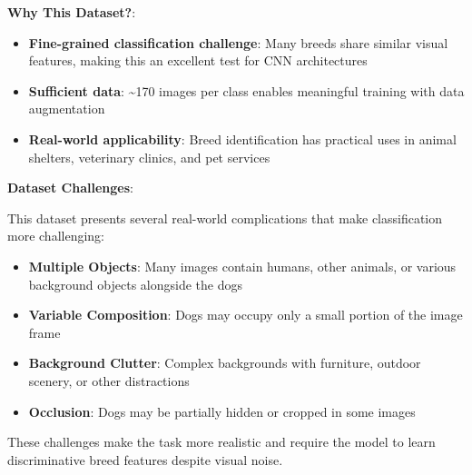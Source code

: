 \documentclass[
  letterpaper,
  DIV=11,
  numbers=noendperiod]{scrartcl}
\providecommand{\tightlist}{%
  \setlength{\itemsep}{0pt}\setlength{\parskip}{0pt}}
\begin{document}
\textbf{Why This Dataset?}:

\begin{itemize}
\tightlist
\item
  \textbf{Fine-grained classification challenge}: Many breeds share
  similar visual features, making this an excellent test for CNN
  architectures
\item
  \textbf{Sufficient data}: \textasciitilde170 images per class enables
  meaningful training with data augmentation
\item
  \textbf{Real-world applicability}: Breed identification has practical
  uses in animal shelters, veterinary clinics, and pet services
\end{itemize}

\textbf{Dataset Challenges}:

This dataset presents several real-world complications that make
classification more challenging:

\begin{itemize}
\tightlist
\item
  \textbf{Multiple Objects}: Many images contain humans, other animals,
  or various background objects alongside the dogs
\item
  \textbf{Variable Composition}: Dogs may occupy only a small portion of
  the image frame
\item
  \textbf{Background Clutter}: Complex backgrounds with furniture,
  outdoor scenery, or other distractions
\item
  \textbf{Occlusion}: Dogs may be partially hidden or cropped in some
  images
\end{itemize}

These challenges make the task more realistic and require the model to
learn discriminative breed features despite visual noise.
\end{document}
